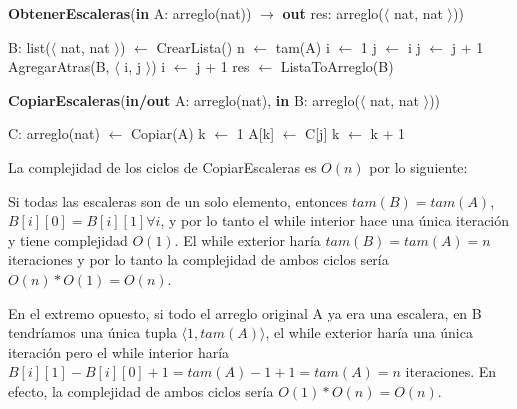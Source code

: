 \begin{algorithm}[H]
\caption{
    \textbf{ObtenerEscaleras}(\textbf{in} A: arreglo(nat)) $\to$ \textbf{out} res: arreglo($\langle$ nat, nat $\rangle$))
}
\begin{algorithmic}[1]
    \State B: list($\langle$ nat, nat $\rangle$) $\gets$ CrearLista() 
    \State n $\gets$ tam(A)
    \State i $\gets$ 1
     
        \State j $\gets$ i
         
            \State j $\gets$ j + 1
        \EndWhile
        \State AgregarAtras(B, $\langle$ i, j $\rangle$) 
        \State i $\gets$ j + 1
    \EndWhile
    \State res $\gets$ ListaToArreglo(B) 
\end{algorithmic}
\end{algorithm}

\begin{algorithm}[H]
\caption{
    \textbf{CopiarEscaleras}(\textbf{in/out} A: arreglo(nat), \textbf{in} B: arreglo($\langle$ nat, nat $\rangle$))
}
\begin{algorithmic}[1]
    \State C: arreglo(nat) $\gets$ Copiar(A) 
    \State k $\gets$ 1
     
            \State A[k] $\gets$ C[j]
            \State k $\gets$ k + 1
        \EndFor
    \EndFor
\end{algorithmic}
\end{algorithm}

La complejidad de los ciclos de CopiarEscaleras es $O(n)$ por lo siguiente:

Si todas las escaleras son de un solo elemento, entonces $tam(B) = tam(A)$, $B[i][0] = B[i][1] \forall i$, y por lo tanto el while interior hace una única iteración y tiene complejidad $O(1)$. El while exterior haría $tam(B) = tam(A) = n$ iteraciones y por lo tanto la complejidad de ambos ciclos sería $O(n) * O(1) = O(n)$.

En el extremo opuesto, si todo el arreglo original A ya era una escalera, en B tendríamos una única tupla $\langle 1, tam(A) \rangle$, el while exterior haría una única iteración pero el while interior haría $B[i][1] - B[i][0] + 1 = tam(A) - 1 + 1 = tam(A) = n$ iteraciones. En efecto, la complejidad de ambos ciclos sería $O(1) * O(n) = O(n)$.

